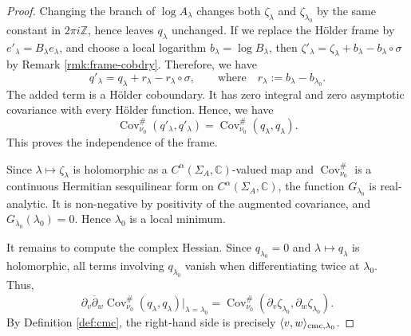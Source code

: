 \documentclass[11pt]{amsart}
\theoremstyle{plain}
\theoremstyle{definition}
\theoremstyle{remark}
\begin{document}
\begin{proof}
Changing the branch of $\log A_\lambda$ changes both
$\zeta_\lambda$ and $\zeta_{\lambda_0}$ by the same constant in
$2\pi i\mathbb Z$, hence leaves $q_\lambda$ unchanged.
If we replace the Hölder frame by
$e'_\lambda=B_\lambda e_\lambda$, and choose a local logarithm
$b_\lambda=\log B_\lambda$, then
$
\zeta'_\lambda =
\zeta_\lambda+b_\lambda-b_\lambda\circ\sigma 
$ by Remark \ref{rmk:frame-cobdry}.
Therefore, we have
$$
q'_\lambda =
q_\lambda+r_\lambda-r_\lambda\circ\sigma,
\qquad \text{where} \quad
r_\lambda:=b_\lambda-b_{\lambda_0}.
$$
The added term is a Hölder coboundary. It has zero integral and zero
asymptotic covariance with every Hölder function. Hence, we have
$$
\operatorname{Cov}^{\#}_{\nu_0}(q'_\lambda,q'_\lambda)
  =
\operatorname{Cov}^{\#}_{\nu_0}(q_\lambda,q_\lambda).
$$
This proves the independence of the frame.

Since $\lambda\mapsto\zeta_\lambda$ is holomorphic as a
$C^\alpha(\Sigma_A,\mathbb C)$-valued map and
$\operatorname{Cov}^{\#}_{\nu_0}$ is a continuous Hermitian
sesquilinear form on $C^\alpha(\Sigma_A,\mathbb C)$, the function
$G_{\lambda_0}$ is real-analytic. It is non-negative by positivity of
the augmented covariance, and $G_{\lambda_0}(\lambda_0)=0$. Hence
$\lambda_0$ is a local minimum.

It remains to compute the complex Hessian. Since
$q_{\lambda_0}=0$ and $\lambda\mapsto q_\lambda$ is holomorphic,
all terms involving $q_{\lambda_0}$ vanish when differentiating twice
at $\lambda_0$. Thus,
$$
\partial_v\overline{\partial}_w \operatorname{Cov}^{\#}_{\nu_0}(q_\lambda,q_\lambda)
  \big|_{\lambda=\lambda_0}
  =
\operatorname{Cov}^{\#}_{\nu_0}
(\partial_v\zeta_{\lambda_0},  \partial_w\zeta_{\lambda_0}).
$$
By Definition \ref{def:cmc}, 
the right-hand side is precisely
$\langle v,w\rangle_{{\rm cmc},\lambda_0}$.
\end{proof}
\end{document}
